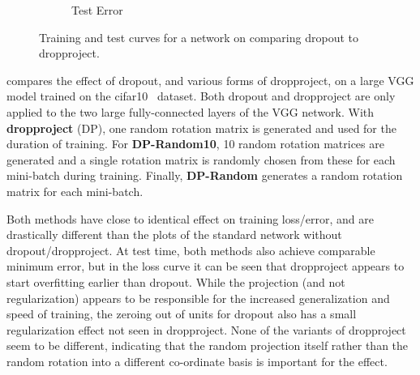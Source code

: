 \documentclass[thesis]{subfiles}
\begin{document}
\begin{figure}[tbp]
\begin{subfigure}[b]{\linewidth}
\caption{ Test Error}
\label{fig:cifar_dropproject_test_acc}
\end{subfigure}
\caption[Dropout \vs dropproject for /]{Training and test curves for a  network on  comparing dropout to dropproject.}
\label{fig:cifar_dropproject}
\end{figure}

 compares the effect of dropout, and various forms of dropproject, on a large VGG model trained on the \gls{cifar10}~\citep{CIFAR10} dataset. Both dropout and dropproject are only applied to the two large fully-connected layers of the VGG network. With \textbf{dropproject} (DP), one random rotation matrix is generated and used for the duration of training. For \textbf{DP-Random10}, 10 random rotation matrices are generated and a single rotation matrix is randomly chosen from these for each mini-batch during training. Finally, \textbf{DP-Random} generates a random rotation matrix for each mini-batch.

Both methods have close to identical effect on training loss/error, and are drastically different than the plots of the standard network without dropout/dropproject. At test time, both methods also achieve comparable minimum error, but in the loss curve it can be seen that dropproject appears to start overfitting earlier than dropout. While the projection (and not regularization) appears to be responsible for the increased generalization and speed of training, the zeroing out of units for dropout also has a small regularization effect not seen in dropproject. None of the variants of dropproject seem to be different, indicating that the random projection itself rather than the random rotation into a different co-ordinate basis is important for the effect.
\end{document}
